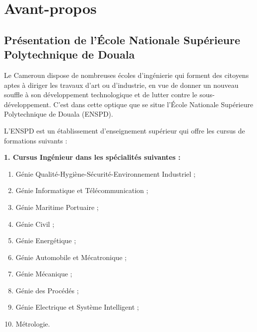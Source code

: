 \documentclass[a4paper,12pt,openany]{report}
\begin{document}
{}
\tableofcontents
\renewcommand{\tableofcontents}{SOMMAIRE}
\thispagestyle{empty}     %


{}
\newpage
 \chapter*{Avant-propos}

\section*{Présentation de l'École Nationale Supérieure Polytechnique de Douala}


\quad 


Le Cameroun dispose de nombreuses écoles d’ingénierie qui forment des citoyens aptes à diriger les travaux d’art ou d’industrie, en vue de donner un nouveau souffle à son développement technologique et de lutter contre le sous-développement. C’est dans cette optique que se situe l’École Nationale Supérieure Polytechnique de Douala (ENSPD).

L’ENSPD est un établissement d’enseignement supérieur qui offre les cursus de formations suivants :

\textbf{1. Cursus Ingénieur dans les spécialités suivantes :}
 
	\begin{enumerate}
	 
	
	\item Génie Qualité-Hygiène-Sécurité-Environnement Industriel ;
	\item Génie Informatique et Télécommunication ;
	\item Génie Maritime Portuaire ;
	\item Génie Civil ;
	\item Génie Energétique ;
	\item Génie Automobile et Mécatronique ;
	\item Génie Mécanique ;
	\item Génie des Procédés ;
	\item Génie Electrique et Système Intelligent ;
	\item Métrologie.
\end{enumerate}
 
\end{document}

